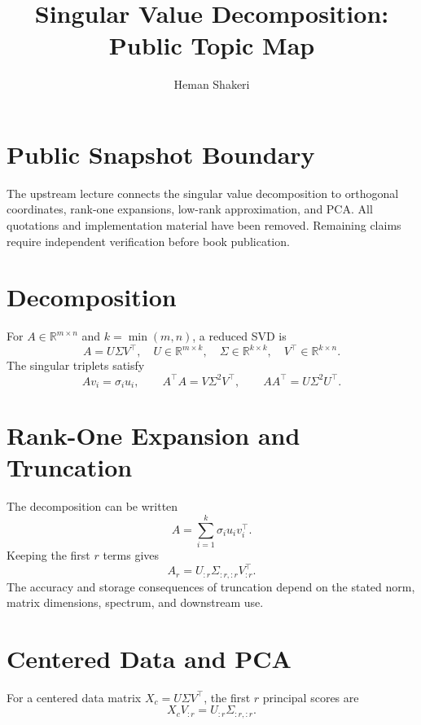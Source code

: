 \documentclass{article}
\title{Singular Value Decomposition: Public Topic Map}
\author{Heman Shakeri}
\date{}
\begin{document}
\maketitle

\section*{Public Snapshot Boundary}

The upstream lecture connects the singular value decomposition to orthogonal
coordinates, rank-one expansions, low-rank approximation, and PCA. All quotations
and implementation material have been removed. Remaining claims require independent
verification before book publication.

\section{Decomposition}

For $A\in\mathbb{R}^{m\times n}$ and $k=\min(m,n)$, a reduced SVD is
\[
  A=U\Sigma V^\top,
  \quad U\in\mathbb{R}^{m\times k},
  \quad \Sigma\in\mathbb{R}^{k\times k},
  \quad V^\top\in\mathbb{R}^{k\times n}.
\]
The singular triplets satisfy
\[
  Av_i=\sigma_i u_i,
  \qquad A^\top A=V\Sigma^2V^\top,
  \qquad AA^\top=U\Sigma^2U^\top.
\]

\section{Rank-One Expansion and Truncation}

The decomposition can be written
\[
  A=\sum_{i=1}^{k}\sigma_i u_i v_i^\top.
\]
Keeping the first $r$ terms gives
\[
  A_r=U_{:r}\Sigma_{:r,:r}V_{:r}^\top.
\]
The accuracy and storage consequences of truncation depend on the stated norm,
matrix dimensions, spectrum, and downstream use.

\section{Centered Data and PCA}

For a centered data matrix $X_c=U\Sigma V^\top$, the first $r$ principal scores are
\[
  X_cV_{:r}=U_{:r}\Sigma_{:r,:r}.
\]

\end{document}
